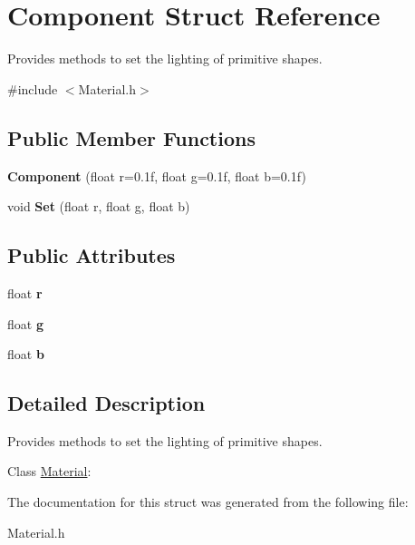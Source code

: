 \hypertarget{struct_component}{\section{Component Struct Reference}
\label{struct_component}
}


Provides methods to set the lighting of primitive shapes.  




{\ttfamily \#include $<$Material.\+h$>$}

\subsection*{Public Member Functions}
\begin{DoxyCompactItemize}
\item 
\hypertarget{struct_component_ae110a300786be861f7ea647ef77d9d18}{{\bfseries Component} (float r=0.\+1f, float g=0.\+1f, float b=0.\+1f)}\label{struct_component_ae110a300786be861f7ea647ef77d9d18}

\item 
\hypertarget{struct_component_a85f599b839327709953f0115dc5dfd49}{void {\bfseries Set} (float r, float g, float b)}\label{struct_component_a85f599b839327709953f0115dc5dfd49}

\end{DoxyCompactItemize}
\subsection*{Public Attributes}
\begin{DoxyCompactItemize}
\item 
\hypertarget{struct_component_a490db57cde183ef5a233b6ff3386ef6f}{float {\bfseries r}}\label{struct_component_a490db57cde183ef5a233b6ff3386ef6f}

\item 
\hypertarget{struct_component_a6cf7bfac62ac8aa4a8aa8c3f847428d8}{float {\bfseries g}}\label{struct_component_a6cf7bfac62ac8aa4a8aa8c3f847428d8}

\item 
\hypertarget{struct_component_abd55184abe2aaf269b38f5913721821c}{float {\bfseries b}}\label{struct_component_abd55184abe2aaf269b38f5913721821c}

\end{DoxyCompactItemize}


\subsection{Detailed Description}
Provides methods to set the lighting of primitive shapes. 

Class \hyperlink{struct_material}{Material}\+: 

The documentation for this struct was generated from the following file\+:\begin{DoxyCompactItemize}
\item 
Material.\+h\end{DoxyCompactItemize}
